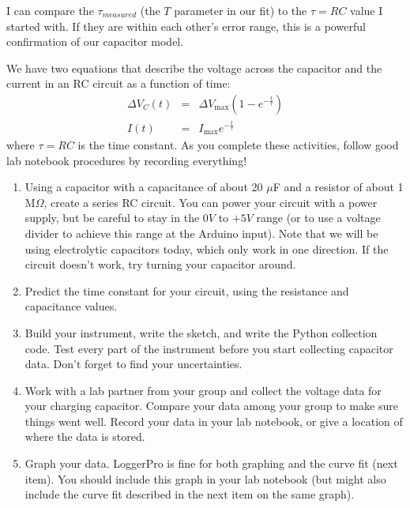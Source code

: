 I can compare the $\tau _{measured}$ (the $T$ parameter in our fit) to the $\tau
=RC$ value I started with. If they are within each other's error range, this
is a powerful confirmation of our capacitor model.

\activity
{
We have two equations that describe the voltage across the capacitor and
the current in an RC circuit as a function of time:
\begin{eqnarray*}
	\Delta V_{C}\left( t\right) &=&\Delta V_{\max }\left( 1-e^{-\frac{t}{\tau }%
}\right) \\
	I\left( t\right) &=&I_{\max }e^{-\frac{t}{\tau }}
\end{eqnarray*}%
where $\tau =RC$
is the time constant. As you complete these activities, follow good lab
notebook procedures by recording everything!

\begin{enumerate}
\item Using a capacitor with a capacitance of about 20 $\mu$F
and a resistor of about 1 M$\Omega$,
create a series RC circuit. You can power your circuit with a power supply,
but be careful to stay in the $0\unit{V}$ to $+5\unit{V}$
range (or to use a voltage divider to achieve this range at the Arduino
input). Note that we will be using electrolytic capacitors today, which only
work in one direction. If the circuit doesn't work, try turning your capacitor
around.

\item Predict the time constant for your circuit, using the resistance and
	capacitance values.
\item Build your instrument, write the sketch, and write the Python collection
code. Test every part of the instrument before you start collecting
capacitor data. Don't forget to find your uncertainties. 

\item Work with a lab
partner from your group and collect the voltage data for your charging
capacitor. Compare your data
among your group to make sure things went well. Record your data in your
lab notebook, or give a location of where the data is stored.

\item Graph your data. LoggerPro is fine for both
graphing and the curve fit (next item). You should include this graph in
your lab notebook (but might also include the curve fit described in the
next item on the same graph).


\end{enumerate}}

